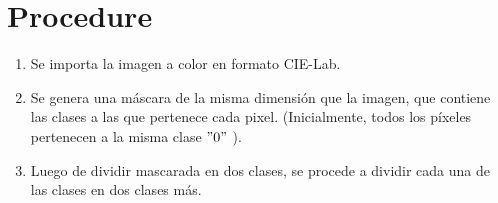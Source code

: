 \section{Procedure}\label{sec:procedure}
\begin{enumerate}
    \item Se importa la imagen a color en formato CIE-Lab.
    \item Se genera una máscara de la misma dimensión que la imagen, que contiene las clases a las que pertenece cada pixel.
    (Inicialmente, todos los píxeles pertenecen a la misma clase \("0"\) ).
    \item Luego de dividir mascarada en dos clases, se procede a dividir cada una de las clases en dos clases más.
\end{enumerate}
